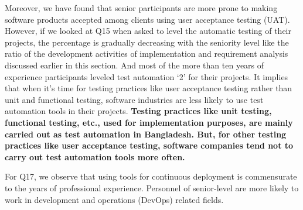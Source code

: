 Moreover, we have found that senior participants are more prone to making software products accepted among clients using user acceptance testing (UAT). However, if we looked at Q15 when asked to level the automatic testing of their projects, the percentage is gradually decreasing with the seniority level like the ratio of the development activities of implementation and requirement analysis discussed earlier in this section. And most of the more than ten years of experience participants leveled test automation `2' for their projects. It implies that when it's time for testing practices like user acceptance testing rather than unit and functional testing, software industries are less likely to use test automation tools in their projects.
\bf{Testing practices like unit testing, functional testing, etc., used for implementation purposes, are mainly carried out as test automation in Bangladesh. But, for other testing practices like user acceptance testing, software companies tend not to carry out test automation tools more often.}

For Q17, we observe that using tools for continuous deployment is commensurate to the years of professional experience. Personnel of senior-level are more likely to work in development and operations (DevOps) related fields.